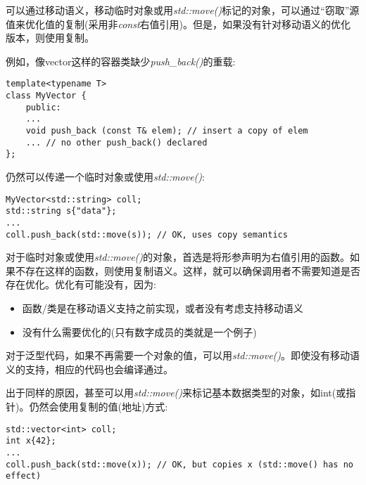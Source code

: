 可以通过移动语义，移动临时对象或用\textit{std::move()}标记的对象，可以通过“窃取”源值来优化值的复制(采用非\textit{const}右值引用)。但是，如果没有针对移动语义的优化版本，则使用复制。\par

例如，像vector这样的容器类缺少\textit{push\_back()}的重载:\par

\begin{lstlisting}[caption={}]
template<typename T>
class MyVector {
	public:
	...
	void push_back (const T& elem); // insert a copy of elem
	... // no other push_back() declared
};
\end{lstlisting}
	
仍然可以传递一个临时对象或使用\textit{std::move()}:\par

\begin{lstlisting}[caption={}]
MyVector<std::string> coll;
std::string s{"data"};
...
coll.push_back(std::move(s)); // OK, uses copy semantics
\end{lstlisting}	
	
对于临时对象或使用\textit{std::move()}的对象，首选是将形参声明为右值引用的函数。如果不存在这样的函数，则使用复制语义。这样，就可以确保调用者不需要知道是否存在优化。优化有可能没有，因为:\par
	
\begin{itemize}
	\item 函数/类是在移动语义支持之前实现，或者没有考虑支持移动语义
	\item 没有什么需要优化的(只有数字成员的类就是一个例子)
\end{itemize}
	
对于泛型代码，如果不再需要一个对象的值，可以用\textit{std::move()}。即使没有移动语义的支持，相应的代码也会编译通过。\par
	
出于同样的原因，甚至可以用\textit{std::move()}来标记基本数据类型的对象，如int(或指针)。仍然会使用复制的值(地址)方式:\par
	
\begin{lstlisting}[caption={}]
std::vector<int> coll;
int x{42};
...
coll.push_back(std::move(x)); // OK, but copies x (std::move() has no effect)
\end{lstlisting}
	
	
	